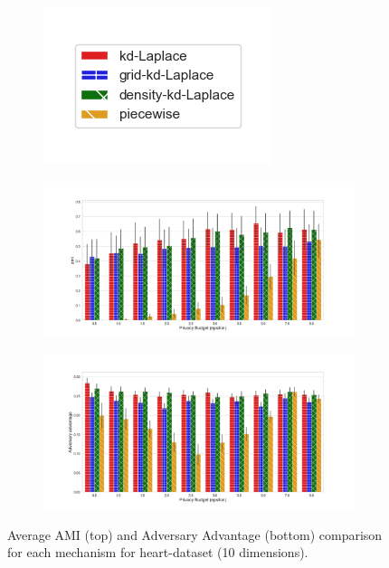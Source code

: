 {\begin{figure}[H]
  \centering
  \begin{subfigure}{0.30\textwidth}
    \includegraphics[width=\textwidth]{Results/kd-laplace/ami_bar_comparison_legend.png}
  \end{subfigure}
  \begin{subfigure}{1\textwidth}
    \includegraphics[width=1\textwidth]{Results/nd-laplace/ami_heart-dataset_comparison.png}
  \end{subfigure}
  \begin{subfigure}{1\textwidth}
    \includegraphics[width=1\textwidth]{Results/nd-laplace/shokri_mi_adv_heart-dataset_comparison.png}
  \end{subfigure}
  \caption{Average AMI (top) and Adversary Advantage (bottom) comparison for each mechanism for heart-dataset (10 dimensions).}
  \label{fig:utility_heart-dataset_comparison_nd_plot}
\end{figure}
\newpage

}

